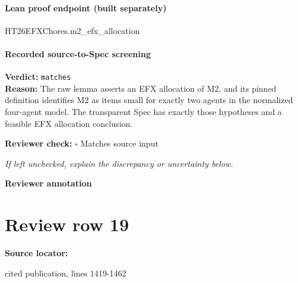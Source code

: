 \documentclass[10pt]{article}
\newcommand{\reviewerbox}{%
  \par\noindent\fbox{\parbox{0.96\linewidth}{\rule{0pt}{0.38in}}}\par
}
\newcommand{\reviewmatch}[1]{%
  \par\noindent\textbf{Reviewer check:} $\square$\; #1\par
  \noindent\emph{If left unchecked, explain the discrepancy or uncertainty below.}\par
}
\begin{document}
\paragraph{Lean proof endpoint (built separately)}\begin{ReviewVerbatim}
HT26EFXChores.m2_efx_allocation
\end{ReviewVerbatim}

\paragraph{Recorded source-to-Spec screening}
\textbf{Verdict:} \texttt{matches}
\\
\textbf{Reason:} The raw lemma asserts an EFX allocation of M2, and its pinned definition identifies M2 as items small for exactly two agents in the normalized four-agent model. The transparent Spec has exactly those hypotheses and a feasible EFX allocation conclusion.
\reviewmatch{Matches source input}
\noindent\textbf{Reviewer annotation}\par
\reviewerbox
\clearpage
\hypertarget{source-claim-687ed4b91a799ce3}{}
\section*{Review row 19}
\textbf{Source locator:} {\footnotesize\raggedright cited publication, lines 1419-\allowbreak{}1462\par}
\end{document}

